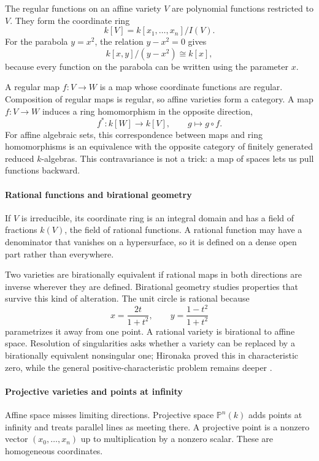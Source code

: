 The regular functions on an affine variety $V$ are polynomial functions restricted to $V$. They form the coordinate ring
\[
 k[V]=k[x_1,\ldots,x_n]/I(V).
\]
For the parabola $y=x^2$, the relation $y-x^2=0$ gives
\[
 k[x,y]/(y-x^2)\cong k[x],
\]
because every function on the parabola can be written using the parameter $x$.

A regular map $f:V\to W$ is a map whose coordinate functions are regular. Composition of regular maps is regular, so affine varieties form a category. A map $f:V\to W$ induces a ring homomorphism in the opposite direction,
\[
 f^*:k[W]\to k[V],\qquad g\mapsto g\circ f.
\]
For affine algebraic sets, this correspondence between maps and ring homomorphisms is an equivalence with the opposite category of finitely generated reduced $k$-algebras. This contravariance is not a trick: a map of spaces lets us pull functions backward.

\paragraph{Rational functions and birational geometry}

If $V$ is irreducible, its coordinate ring is an integral domain and has a field of fractions $k(V)$, the field of rational functions. A rational function may have a denominator that vanishes on a hypersurface, so it is defined on a dense open part rather than everywhere.

Two varieties are birationally equivalent if rational maps in both directions are inverse wherever they are defined. Birational geometry studies properties that survive this kind of alteration. The unit circle is rational because
\[
 x=\frac{2t}{1+t^2},\qquad y=\frac{1-t^2}{1+t^2}
\]
parametrizes it away from one point. A rational variety is birational to affine space. Resolution of singularities asks whether a variety can be replaced by a birationally equivalent nonsingular one; Hironaka proved this in characteristic zero, while the general positive-characteristic problem remains deeper \cite{algebraic_geometry_ref1,algebraic_geometry_ref5}.

\paragraph{Projective varieties and points at infinity}

Affine space misses limiting directions. Projective space $\mathbb P^n(k)$ adds points at infinity and treats parallel lines as meeting there. A projective point is a nonzero vector $(x_0,\ldots,x_n)$ up to multiplication by a nonzero scalar. These are homogeneous coordinates.


